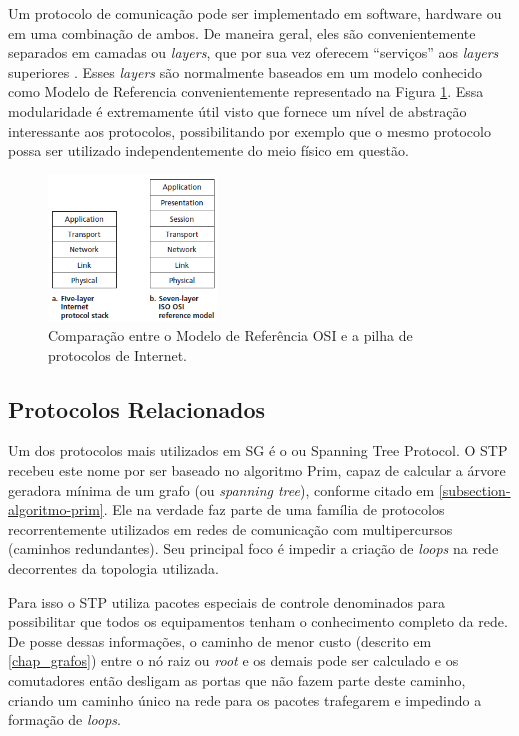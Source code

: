 Um protocolo de comunicação pode ser implementado em software, hardware ou em uma combinação de ambos. De maneira geral, eles são convenientemente separados em camadas ou \emph{layers}, que por sua vez oferecem ``serviços'' aos \emph{layers} superiores \cite{Book-Kurose2013}. Esses \emph{layers} são normalmente baseados em um modelo conhecido como Modelo de Referencia  convenientemente representado na Figura \ref{fig_modelo_OSI}. Essa modularidade é extremamente útil visto que fornece um nível de abstração interessante aos protocolos, possibilitando por exemplo que o mesmo protocolo possa ser utilizado independentemente do meio físico em questão.

\begin{figure}[!htb]
	\centering
	\includegraphics[width=0.4\textwidth]{./figuras/Modelo-OSI.png} %
	\caption[Modelo OSI]{Comparação entre o Modelo de Referência OSI e a pilha de protocolos de Internet.}
	\label{fig_modelo_OSI}
\end{figure}

\subsection{Protocolos Relacionados}
Um dos protocolos mais utilizados em SG é o  ou Spanning Tree Protocol. O STP recebeu este nome por ser baseado no algoritmo Prim, capaz de calcular a árvore geradora mínima de um grafo (ou \emph{spanning tree}), conforme citado em \ref{subsection-algoritmo-prim}. Ele na verdade faz parte de uma família de protocolos recorrentemente utilizados em redes de comunicação com multipercursos (caminhos redundantes). Seu principal foco é impedir a criação de \emph{loops} na rede decorrentes da topologia utilizada.

Para isso o STP utiliza pacotes especiais de controle denominados  para possibilitar que todos os equipamentos tenham o conhecimento completo da rede. De posse dessas informações, o caminho de menor custo (descrito em \ref{chap_grafos}) entre o nó raiz ou \emph{root} e os demais pode ser calculado e os comutadores então desligam as portas que não fazem parte deste caminho, criando um caminho único na rede para os pacotes trafegarem e impedindo a formação de \emph{loops}.

